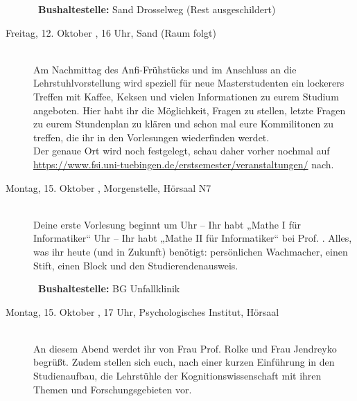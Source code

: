 \begin{description}
~\textbf{Bushaltestelle:} Sand Drosselweg (Rest ausgeschildert)

\ifmaster
\item[Freitag, 12. Oktober \YEAR, 16 Uhr, Sand (Raum folgt)]\ \\
Am Nachmittag des Anfi-Frühstücks und im Anschluss an die Lehrstuhlvorstellung wird speziell für neue Masterstudenten ein lockerers Treffen mit Kaffee, Keksen und vielen Informationen zu eurem Studium angeboten.
Hier habt ihr die Möglichkeit, Fragen zu stellen, letzte Fragen zu eurem Stundenplan zu klären und schon mal eure Kommilitonen zu treffen, die ihr in den Vorlesungen wiederfinden werdet. \\
Der genaue Ort wird noch festgelegt, schau daher vorher nochmal auf \url{https://www.fsi.uni-tuebingen.de/erstsemester/veranstaltungen/} nach.
\fi

\ifbachelor
\item[Montag, 15. Oktober \YEAR, Morgenstelle, Hörsaal N7]\ \\
Deine erste Vorlesung beginnt um
 Uhr -- Ihr habt „Mathe I für Informatiker“  \fi
{} Uhr -- Ihr habt „Mathe II für Informatiker“  \fi
bei Prof. \Matheprof.
Alles, was ihr heute (und in Zukunft) benötigt: persönlichen Wachmacher, einen Stift, einen Block und den Studierendenausweis.

~\textbf{Bushaltestelle:} BG Unfallklinik
\fi





\ifkogwiss
\ifbachelor
\item[Montag, 15. Oktober \YEAR, 17 Uhr, Psychologisches Institut, Hörsaal]\ \\
An diesem Abend werdet ihr von Frau Prof. Rolke und Frau Jendreyko begrüßt. Zudem stellen sich euch, nach einer kurzen Einführung in den Studienaufbau, die Lehrstühle der Kognitionswissenschaft mit ihren Themen und Forschungsgebieten vor.
\fi


\end{description}
